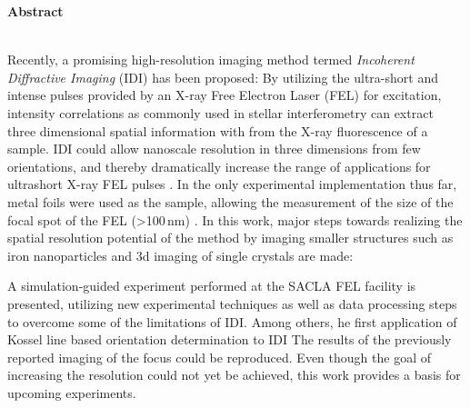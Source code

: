 	\begin{Huge}
		\textbf{Abstract}\vspace{12mm}
	\end{Huge}
\\
Recently, a promising high-resolution imaging method termed \textit{Incoherent Diffractive Imaging} (IDI) has been proposed: By utilizing the ultra-short and intense pulses provided by an X-ray Free Electron Laser (FEL) for excitation,  intensity correlations as commonly used in stellar interferometry can extract three dimensional spatial information with from the X-ray fluorescence of a sample.  
IDI could allow nanoscale resolution in three dimensions from few orientations, and thereby dramatically increase the range of applications for ultrashort X-ray FEL pulses \cite{classen2017}.  
In the only experimental implementation thus far, metal foils were used as the sample, allowing the measurement of the size of the focal spot of the FEL (>100\,nm) \cite{nakumura2020}.
In this work, major steps towards realizing the spatial resolution potential of the method by imaging smaller structures such as iron nanoparticles and 3d imaging of single crystals are made: 

A simulation-guided experiment performed at the SACLA FEL facility is presented, utilizing new experimental techniques as well as data processing steps to overcome some of the limitations of IDI. Among others, he first application of Kossel line based orientation determination to IDI 
The results of the previously reported imaging of the focus could be reproduced. 
Even though the goal of increasing the resolution could not yet be achieved, this work provides a basis for upcoming experiments.

 \vspace{1cm}
 
